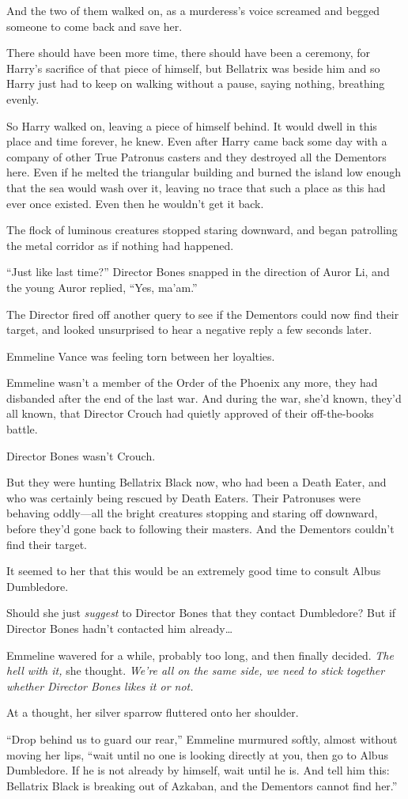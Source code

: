 And the two of them walked on, as a murderess’s voice screamed and begged someone to come back and save her.

There should have been more time, there should have been a ceremony, for Harry’s sacrifice of that piece of himself, but Bellatrix was beside him and so Harry just had to keep on walking without a pause, saying nothing, breathing evenly.

So Harry walked on, leaving a piece of himself behind. It would dwell in this place and time forever, he knew. Even after Harry came back some day with a company of other True Patronus casters and they destroyed all the Dementors here. Even if he melted the triangular building and burned the island low enough that the sea would wash over it, leaving no trace that such a place as this had ever once existed. Even then he wouldn’t get it back.

\later

The flock of luminous creatures stopped staring downward, and began patrolling the metal corridor as if nothing had happened.

“Just like last time?” Director Bones snapped in the direction of Auror Li, and the young Auror replied, “Yes, ma’am.”

The Director fired off another query to see if the Dementors could now find their target, and looked unsurprised to hear a negative reply a few seconds later.

Emmeline Vance was feeling torn between her loyalties.

Emmeline wasn’t a member of the Order of the Phoenix any more, they had disbanded after the end of the last war. And during the war, she’d known, they’d all known, that Director Crouch had quietly approved of their off-the-books battle.

Director Bones wasn’t Crouch.

But they were hunting Bellatrix Black now, who had been a Death Eater, and who was certainly being rescued by Death Eaters. Their Patronuses were behaving oddly—all the bright creatures stopping and staring off downward, before they’d gone back to following their masters. And the Dementors couldn’t find their target.

It seemed to her that this would be an extremely good time to consult Albus Dumbledore.

Should she just \emph{suggest} to Director Bones that they contact Dumbledore? But if Director Bones hadn’t contacted him already…

Emmeline wavered for a while, probably too long, and then finally decided. \emph{The hell with it,} she thought. \emph{We’re all on the same side, we need to stick together whether Director Bones likes it or not.}

At a thought, her silver sparrow fluttered onto her shoulder.

“Drop behind us to guard our rear,” Emmeline murmured softly, almost without moving her lips, “wait until no one is looking directly at you, then go to Albus Dumbledore. If he is not already by himself, wait until he is. And tell him this: Bellatrix Black is breaking out of Azkaban, and the Dementors cannot find her.”
